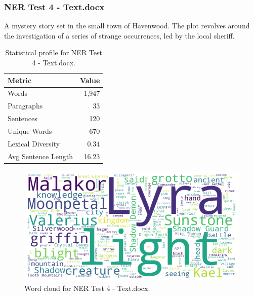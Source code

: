 \subsubsection*{NER Test 4 - Text.docx}
A mystery story set in the small town of Havenwood. The plot revolves around the investigation of a series of strange occurrences, led by the local sheriff.

\begin{table}[!ht]
\centering
\begin{tabular}{lr}
\toprule
\textbf{Metric} & \textbf{Value} \\
\midrule
Words & 1,947 \\
Paragraphs & 33 \\
Sentences & 120 \\
Unique Words & 670 \\
Lexical Diversity & 0.34 \\
Avg Sentence Length & 16.23 \\
\bottomrule
\end{tabular}
\caption{Statistical profile for NER Test 4 - Text.docx.}
\label{tab:ner4_stats}
\end{table}

\begin{figure}[!ht]
  \centering
  \includegraphics[width=\textwidth]{figures/appendix_fig/GRP002EXP004_eda_wordcloud.png}
  \caption{Word cloud for NER Test 4 - Text.docx.}
  \label{fig:ner4_wordcloud}
\end{figure}

